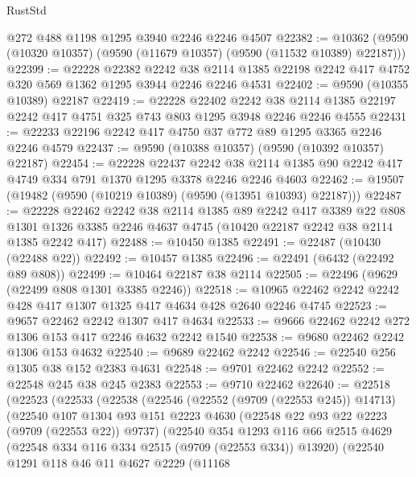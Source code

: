 \begin{lexlean}{RustStd}
\begin{coremodule}
    @272
    @488
    @1198
    @1295
    @3940
    @2246
    @2246
    @4507
@22382 := @10362 (@9590 (@10320 @10357) (@9590 (@11679 @10357) (@9590 (@11532 @10389) @22187)))
@22399 := @22228
    @22382
    @2242
    @38
    @2114
    @1385
    @22198
    @2242
    @417
    @4752
    @320
    @569
    @1362
    @1295
    @3944
    @2246
    @2246
    @4531
@22402 := @9590 (@10355 @10389) @22187
@22419 := @22228
    @22402
    @2242
    @38
    @2114
    @1385
    @22197
    @2242
    @417
    @4751
    @325
    @743
    @803
    @1295
    @3948
    @2246
    @2246
    @4555
@22431 := @22233 @22196 @2242 @417 @4750 @37 @772 @89 @1295 @3365 @2246 @2246 @4579
@22437 := @9590 (@10388 @10357) (@9590 (@10392 @10357) @22187)
@22454 := @22228
    @22437
    @2242
    @38
    @2114
    @1385
    @90
    @2242
    @417
    @4749
    @334
    @791
    @1370
    @1295
    @3378
    @2246
    @2246
    @4603
@22462 := @19507 (@19482 (@9590 (@10219 @10389) (@9590 (@13951 @10393) @22187)))
@22487 := @22228
    @22462
    @2242
    @38
    @2114
    @1385
    @89
    @2242
    @417
    @3389
    @22
    @808
    @1301
    @1326
    @3385
    @2246
    @4637
    @4745
    (@10420 @22187 @2242 @38 @2114 @1385 @2242 @417)
@22488 := @10450 @1385
@22491 := @22487 (@10430 (@22488 @22))
@22492 := @10457 @1385
@22496 := @22491 (@6432 (@22492 @89 @808))
@22499 := @10464 @22187 @38 @2114
@22505 := @22496 (@9629 (@22499 @808 @1301 @3385 @2246))
@22518 := @10965 @22462 @2242 @2242 @428 @417 @1307 @1325 @417 @4634 @428 @2640 @2246 @4745
@22523 := @9657 @22462 @2242 @1307 @417 @4634
@22533 := @9666 @22462 @2242 @272 @1306 @153 @417 @2246 @4632 @2242 @1540
@22538 := @9680 @22462 @2242 @1306 @153 @4632
@22540 := @9689 @22462 @2242
@22546 := @22540 @256 @1305 @38 @152 @2383 @4631
@22548 := @9701 @22462 @2242
@22552 := @22548 @245 @38 @245 @2383
@22553 := @9710 @22462
@22640 := @22518
    (@22523
      (@22533
        (@22538
          (@22546
            (@22552 (@9709 (@22553 @245)) @14713)
            (@22540
              @107
              @1304
              @93
              @151
              @2223
              @4630
              (@22548 @22 @93 @22 @2223 (@9709 (@22553 @22)) @9737)
              (@22540
                @354
                @1293
                @116
                @66
                @2515
                @4629
                (@22548 @334 @116 @334 @2515 (@9709 (@22553 @334)) @13920)
                (@22540
                  @1291
                  @118
                  @46
                  @11
                  @4627
                  @2229
                  (@11168

\end{coremodule}
\end{lexlean}
